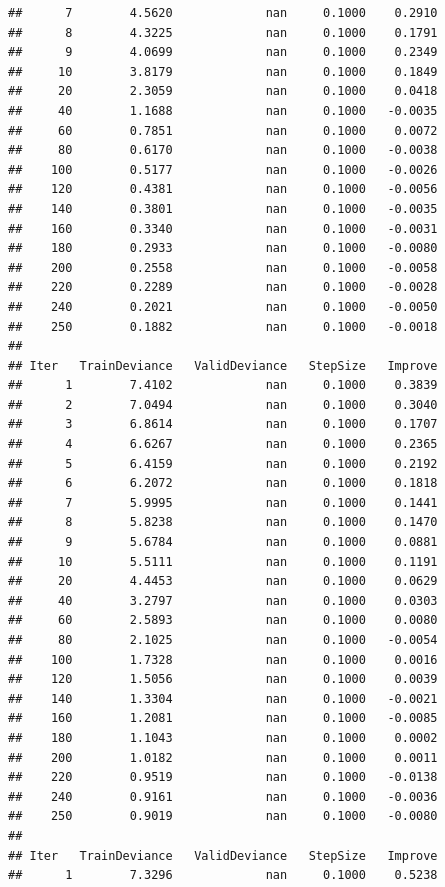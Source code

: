 \documentclass[]{book}
\begin{document}
\begin{verbatim}
##      7        4.5620             nan     0.1000    0.2910
##      8        4.3225             nan     0.1000    0.1791
##      9        4.0699             nan     0.1000    0.2349
##     10        3.8179             nan     0.1000    0.1849
##     20        2.3059             nan     0.1000    0.0418
##     40        1.1688             nan     0.1000   -0.0035
##     60        0.7851             nan     0.1000    0.0072
##     80        0.6170             nan     0.1000   -0.0038
##    100        0.5177             nan     0.1000   -0.0026
##    120        0.4381             nan     0.1000   -0.0056
##    140        0.3801             nan     0.1000   -0.0035
##    160        0.3340             nan     0.1000   -0.0031
##    180        0.2933             nan     0.1000   -0.0080
##    200        0.2558             nan     0.1000   -0.0058
##    220        0.2289             nan     0.1000   -0.0028
##    240        0.2021             nan     0.1000   -0.0050
##    250        0.1882             nan     0.1000   -0.0018
## 
## Iter   TrainDeviance   ValidDeviance   StepSize   Improve
##      1        7.4102             nan     0.1000    0.3839
##      2        7.0494             nan     0.1000    0.3040
##      3        6.8614             nan     0.1000    0.1707
##      4        6.6267             nan     0.1000    0.2365
##      5        6.4159             nan     0.1000    0.2192
##      6        6.2072             nan     0.1000    0.1818
##      7        5.9995             nan     0.1000    0.1441
##      8        5.8238             nan     0.1000    0.1470
##      9        5.6784             nan     0.1000    0.0881
##     10        5.5111             nan     0.1000    0.1191
##     20        4.4453             nan     0.1000    0.0629
##     40        3.2797             nan     0.1000    0.0303
##     60        2.5893             nan     0.1000    0.0080
##     80        2.1025             nan     0.1000   -0.0054
##    100        1.7328             nan     0.1000    0.0016
##    120        1.5056             nan     0.1000    0.0039
##    140        1.3304             nan     0.1000   -0.0021
##    160        1.2081             nan     0.1000   -0.0085
##    180        1.1043             nan     0.1000    0.0002
##    200        1.0182             nan     0.1000    0.0011
##    220        0.9519             nan     0.1000   -0.0138
##    240        0.9161             nan     0.1000   -0.0036
##    250        0.9019             nan     0.1000   -0.0080
## 
## Iter   TrainDeviance   ValidDeviance   StepSize   Improve
##      1        7.3296             nan     0.1000    0.5238

\end{verbatim}
\end{document}

